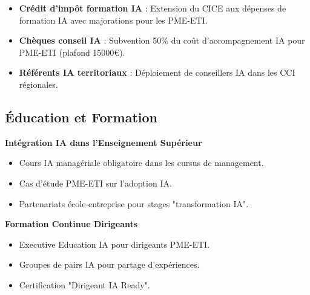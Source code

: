 \begin{itemize}
    \item \textbf{Crédit d'impôt formation IA} : Extension du CICE aux dépenses de formation IA avec majorations pour les PME-ETI.
    \item \textbf{Chèques conseil IA} : Subvention 50\% du coût d'accompagnement IA pour PME-ETI (plafond 15000€).
    \item \textbf{Référents IA territoriaux} : Déploiement de conseillers IA dans les CCI régionales.
\end{itemize}

\subsection{Éducation et Formation}

\textbf{Intégration IA dans l'Enseignement Supérieur}
\begin{itemize}
    \item Cours IA managériale obligatoire dans les cursus de management.
    \item Cas d'étude PME-ETI sur l'adoption IA.
    \item Partenariats école-entreprise pour stages "transformation IA".
\end{itemize}

\textbf{Formation Continue Dirigeants}
\begin{itemize}
    \item Executive Education IA pour dirigeants PME-ETI.
    \item Groupes de pairs IA pour partage d'expériences.
    \item Certification "Dirigeant IA Ready".
\end{itemize}
